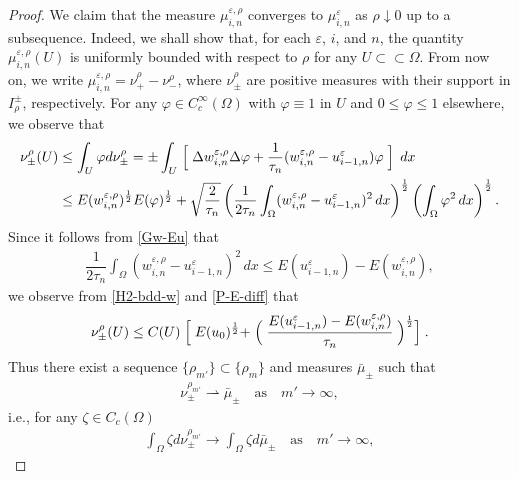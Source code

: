 \documentclass[12pt]{amsart}
\begin{document}
\begin{proof}
We claim that the measure $\mu^{{\varepsilon},\rho}_{i,n}$ converges to $\mu^{\varepsilon}_{i,n}$ as $\rho \downarrow 0$ 
up to a subsequence. Indeed, we shall show that, for each ${\varepsilon}$, $i$, and $n$, the quantity 
$\mu^{{\varepsilon},\rho}_{i,n}(U)$ is uniformly bounded with respect to $\rho$ for any $U \subset \subset \Omega$.   
From now on, we write $\mu^{{\varepsilon},\rho}_{i,n}= \nu^{\rho}_+ - \nu^{\rho}_-$, where $\nu^{\rho}_{\pm}$ are positive 
measures with their support in $I^{\pm}_{\rho}$, respectively. 
For any ${\varphi} \in C^\infty_c(\Omega)$ with ${\varphi} \equiv 1$ in $U$ and $0 \le {\varphi} \le 1$ elsewhere, we observe that 
\begin{align*}
\nu^{\rho}_{\pm}(U)  
&\le \int_{U} {\varphi} d \nu^{\rho}_{\pm} 
= \pm \int_{U} 
       \Bigm[ \Delta w^{{\varepsilon},\rho}_{i,n} \Delta {\varphi} + \dfrac{1}{\tau_n}(w^{{\varepsilon},\rho}_{i,n} - u^{\varepsilon}_{i-1,n}) {\varphi} \Bigm]\, dx \\
& \le E(w^{{\varepsilon},\rho}_{i,n})^{{\frac{1}{2}}} E({\varphi})^{\frac{1}{2}} 
 + \sqrt{\dfrac{2}{\tau_n}} 
       \left( \dfrac{1}{2 \tau_n} \int_\Omega (w^{{\varepsilon},\rho}_{i,n} - u^{\varepsilon}_{i-1,n})^2 \, dx \right)^{\frac{1}{2}}
       \left( \int_\Omega {\varphi}^2 \, dx \right)^{\frac{1}{2}}. 
\end{align*}
Since it follows from \eqref{Gw-Eu} that 
\begin{align} \label{P-E-diff}
\dfrac{1}{2 \tau_n} \int_\Omega (w^{{\varepsilon},\rho}_{i,n} - u^{\varepsilon}_{i-1,n})^2 \, dx 
  \le E(u^{\varepsilon}_{i-1,n}) - E(w^{{\varepsilon}, \rho}_{i,n}), 
\end{align}
we observe from \eqref{H2-bdd-w} and \eqref{P-E-diff} that   
\begin{align} \label{pre-measu-bdd-1-1}
\nu^{\rho}_{\pm}(U) 
 \le C(U) \Bigm[ E(u_0)^{\frac{1}{2}} + \Bigm( \dfrac{E(u^{\varepsilon}_{i-1,n}) - E(w^{{\varepsilon}, \rho}_{i,n})}{\tau_n} \Bigm)^{\frac{1}{2}} \Bigm]. 
\end{align}
Thus there exist a sequence $\{ \rho_{m'} \} \subset \{ \rho_m \}$ and measures $\bar{\mu}_{\pm}$ such that 
\begin{align} \label{nu-to-mu-1}
\nu^{\rho_{m'}}_{\pm} \rightharpoonup \bar{\mu}_{\pm} \quad \text{as} \quad m' \to \infty,  
\end{align}
i.e., for any ${\zeta} \in C_c(\Omega)$ 
\begin{align*}
\int_\Omega {\zeta} d \nu^{\rho_{m'}}_{\pm} \to \int_\Omega {\zeta} d \bar{\mu}_{\pm}  \quad \text{as} \quad m' \to \infty,  

\end{align*}
\end{proof}
\end{document}
